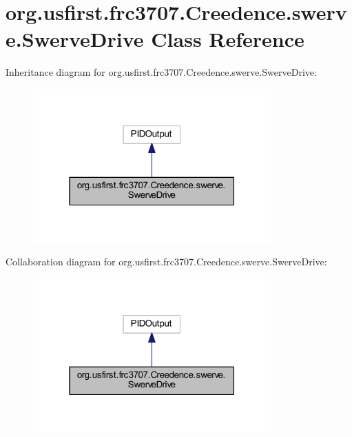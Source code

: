 \hypertarget{classorg_1_1usfirst_1_1frc3707_1_1_creedence_1_1swerve_1_1_swerve_drive}{}\section{org.\+usfirst.\+frc3707.\+Creedence.\+swerve.\+Swerve\+Drive Class Reference}
\label{classorg_1_1usfirst_1_1frc3707_1_1_creedence_1_1swerve_1_1_swerve_drive}


Inheritance diagram for org.\+usfirst.\+frc3707.\+Creedence.\+swerve.\+Swerve\+Drive\+:
\nopagebreak
\begin{figure}[H]
\begin{center}
\leavevmode
\includegraphics[width=259pt]{classorg_1_1usfirst_1_1frc3707_1_1_creedence_1_1swerve_1_1_swerve_drive__inherit__graph}
\end{center}
\end{figure}


Collaboration diagram for org.\+usfirst.\+frc3707.\+Creedence.\+swerve.\+Swerve\+Drive\+:
\nopagebreak
\begin{figure}[H]
\begin{center}
\leavevmode
\includegraphics[width=259pt]{classorg_1_1usfirst_1_1frc3707_1_1_creedence_1_1swerve_1_1_swerve_drive__coll__graph}
\end{center}
\end{figure}
